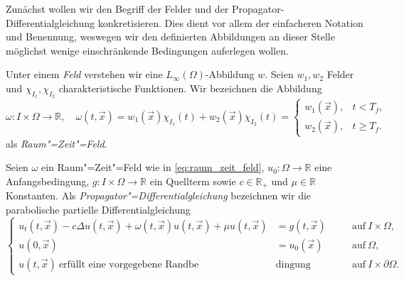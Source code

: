 \documentclass[../main.tex]{subfiles}
\begin{document}
Zunächst wollen wir den Begriff der Felder und der Propagator-Differentialgleichung konkretisieren.
Dies dient vor allem der einfacheren Notation und Benennung, weswegen wir den definierten Abbildungen an dieser Stelle möglichst wenige einschränkende Bedingungen auferlegen wollen.

\begin{Definition}
\label{definition:feld_raum_zeit_feld}
    Unter einem \emph{Feld} verstehen wir eine $L_{\infty}(\Omega)$-Abbildung $w$.
    Seien $w_{1}, w_{2}$ Felder und $\chi_{I_{1}}, \chi_{I_{2}}$ charakteristische Funktionen.
    Wir bezeichnen die Abbildung
    \begin{equation}
    \label{eq:raum_zeit_feld}
        \omega \colon I \times \Omega \to \mathbb{R}, \quad \omega(t, \vec{x}) =
        w_{1}(\vec{x}) \chi_{I_{1}}(t) + w_{2}(\vec{x}) \chi_{I_{2}}(t)
        =
        \begin{cases}
            w_{1}(\vec{x}), & t < T_{f}, \\
            w_{2}(\vec{x}), & t \geq T_{f}.
        \end{cases}
    \end{equation}
    als \emph{Raum"=Zeit"=Feld}.
\end{Definition}

\begin{Definition}
\label{definition:propagator_differentialgleichung}
    Seien $\omega$ ein Raum"=Zeit"=Feld wie in \cref{eq:raum_zeit_feld}, $u_{0} \colon \Omega \to \mathbb{R}$ eine Anfangsbedingung, $g \colon I \times \Omega \to \mathbb{R}$ ein Quellterm sowie $c \in \mathbb{R}_{+}$ und $\mu \in \mathbb{R}$ Konstanten.
    Als \emph{Propagator"=Differentialgleichung} bezeichnen wir die parabolische partielle Differentialgleichung
    \begin{equation}
    \label{eq:propagator_differentialgleichung}
        \left\{
        \begin{aligned}
            u_{t}(t, \vec{x}) - c \Delta u(t, \vec{x}) + \omega(t, \vec{x}) u(t, \vec{x}) + \mu u(t, \vec{x}) &= g(t, \vec{x}) \quad &&\text{auf}~I \times \Omega,\\
            u(0, \vec{x}) &= u_{0}(\vec{x}) \quad &&\text{auf}~\Omega, \\
            u(t, \vec{x})~\text{erfüllt eine vorgegebene Randbe}&\text{dingung} &&\text{auf}~I \times \partial \Omega.
        \end{aligned}
        \right.
    \end{equation}
\end{Definition}
\end{document}

